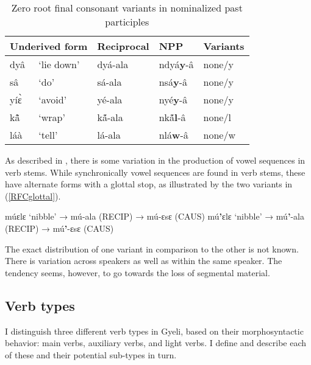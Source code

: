 \begin{table} 
\centering
\small
\begin{tabular}{ll|ll|l}
\multicolumn{2}{l|}{Underived form}  & Reciprocal         & NPP  & Variants \\
 \midrule
dyâ			& `lie down'    &  dyá-ala      	& ndyá{\bfseries y}-â     & none/y \\
sâ			& `do'              &  sá-ala      	& nsá{\bfseries y}-â     & none/y \\
yíɛ̀			& `avoid'         &  yé-ala      	& nyé{\bfseries y}-â     & none/y \\
kã̂ 			& `wrap' 	       &  kã́-ala              & nkã́{\bfseries l}-â	     &   none/l \\
láà			& `tell'		& lá-ala		& nlá{\bfseries w}-â        & none/w \\ 
 \midrule
\end{tabular}
\caption{Zero root final consonant variants in nominalized past participles}
\label{Tab:zeroRFC}
\end{table} 

As described in , there is some variation in the production of vowel sequences in verb stems. While synchronically vowel sequences are found in verb stems, these have  alternate forms with a glottal stop, as illustrated by the two variants in (\ref{RFCglottal}).   

\begin{exe}
\ex\label{RFCglottal}
\begin{xlist}
\ex múɛlɛ `nibble'  → mú-ala (RECIP) → mú-ɛsɛ (CAUS)
\ex mú{\bfseries '}ɛlɛ `nibble'  → mú{\bfseries '}-ala (RECIP) → mú{\bfseries '}-ɛsɛ (CAUS)
\end{xlist}
\end{exe}

\noindent The exact distribution of one variant in comparison to the other is not known. There is variation across speakers as well as within the same speaker. The tendency seems, however, to go towards the loss of segmental material.

 






\subsection{Verb types}
\label{sec:StructTypes}

I distinguish three different verb types in Gyeli, based on their morphosyntactic behavior: main verbs, auxiliary verbs, and light verbs. I define and describe each of these and their potential sub-types in turn.



